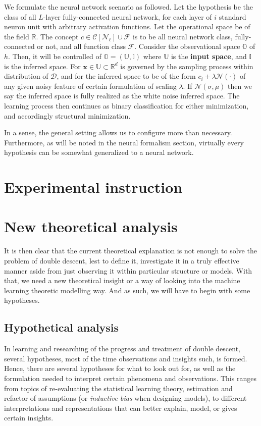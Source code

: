 \begin{setting}
    We formulate the neural network scenario as followed. Let the hypothesis be the class of all $L$-layer fully-connected neural network, for each layer of $i$ standard neuron unit with arbitrary activation functions. Let the operational space be of the field $\mathbb{R}$. The concept $c\in \mathcal{C}[\mathcal{N}_{\ell}]\cup \mathcal{F}$ is to be all neural network class, fully-connected or not, and all function class $\mathcal{F}$. Consider the observational space $\mathbb{O}$ of $h$. Then, it will be controlled of $\mathbb{O}=(\mathbb{U},\mathbb{I})$ where $\mathbb{U}$ is the \textbf{input space}, and $\mathbb{I}$ is the inferred space. For $\mathbf{x}\in \mathbb{U}\subset \mathbb{R}^{d}$ is governed by the sampling process within distribution of $\mathcal{D}$, and for the inferred space to be of the form $c_{i}+\lambda\mathcal{N}(\cdot)$ of any given noisy feature of certain formulation of scaling $\lambda$. If $\mathcal{N}(\sigma, \mu)$ then we say the inferred space is fully realized as the white noise inferred space. The learning process then continues as binary classification for either minimization, and accordingly structural minimization. 
\end{setting}
In a sense, the general setting allows us to configure more than necessary. Furthermore, as will be noted in the neural formalism section, virtually every hypothesis can be somewhat generalized to a neural network. 

\clearpage
\section{Experimental instruction}

\clearpage

\section{New theoretical analysis}

It is then clear that the current theoretical explanation is not enough to solve the problem of double descent, lest to define it, investigate it in a truly effective manner aside from just observing it within particular structure or models. With that, we need a new theoretical insight or a way of looking into the machine learning theoretic modelling way. And as such, we will have to begin with some hypotheses. 

\subsection{Hypothetical analysis}
In learning and researching of the progress and treatment of double descent, several hypotheses, most of the time observations and insights such, is formed. Hence, there are several hypotheses for what to look out for, as well as the formulation needed to interpret certain phenomena and observations. This ranges from topics of re-evaluating the statistical learning theory, estimation and refactor of assumptions (or \textit{inductive bias} when designing models), to different interpretations and representations that can better explain, model, or gives certain insights.  
